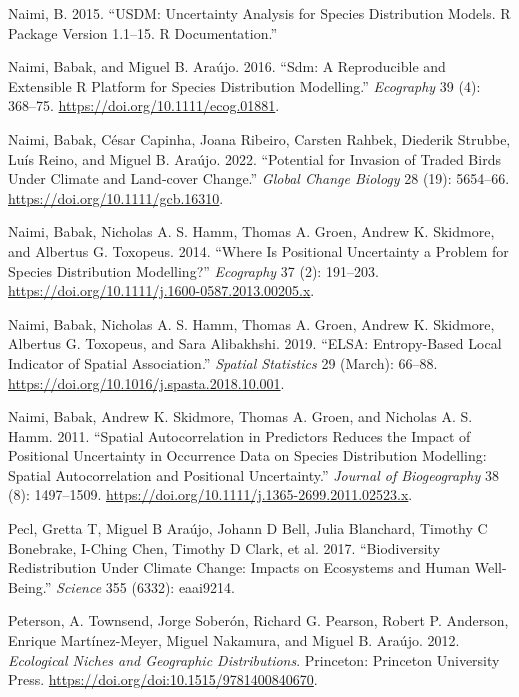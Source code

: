 \documentclass[
]{article}
\newlength{\cslhangindent}
\newenvironment{CSLReferences}[2] %
 {\begin{list}{}{%
  \setlength{\itemindent}{0pt}
  \setlength{\leftmargin}{0pt}
  \setlength{\parsep}{0pt}
  \ifodd #1
   \setlength{\leftmargin}{\cslhangindent}
   \setlength{\itemindent}{-1\cslhangindent}
  \fi
  \setlength{\itemsep}{#2\baselineskip}}}
 {\end{list}}
\begin{document}
\begin{CSLReferences}{1}{0}
Naimi, B. 2015. {``USDM: Uncertainty Analysis for Species Distribution
Models. R Package Version 1.1--15. R Documentation.''}

Naimi, Babak, and Miguel B. Araújo. 2016. {``Sdm: A Reproducible and
Extensible {R} Platform for Species Distribution Modelling.''}
\emph{Ecography} 39 (4): 368--75.
\url{https://doi.org/10.1111/ecog.01881}.

Naimi, Babak, César Capinha, Joana Ribeiro, Carsten Rahbek, Diederik
Strubbe, Luís Reino, and Miguel B. Araújo. 2022. {``Potential for
Invasion of Traded Birds Under Climate and Land‐cover Change.''}
\emph{Global Change Biology} 28 (19): 5654--66.
\url{https://doi.org/10.1111/gcb.16310}.

Naimi, Babak, Nicholas A. S. Hamm, Thomas A. Groen, Andrew K. Skidmore,
and Albertus G. Toxopeus. 2014. {``Where Is Positional Uncertainty a
Problem for Species Distribution Modelling?''} \emph{Ecography} 37 (2):
191--203. \url{https://doi.org/10.1111/j.1600-0587.2013.00205.x}.

Naimi, Babak, Nicholas A. S. Hamm, Thomas A. Groen, Andrew K. Skidmore,
Albertus G. Toxopeus, and Sara Alibakhshi. 2019. {``{ELSA}:
{Entropy}-Based Local Indicator of Spatial Association.''} \emph{Spatial
Statistics} 29 (March): 66--88.
\url{https://doi.org/10.1016/j.spasta.2018.10.001}.

Naimi, Babak, Andrew K. Skidmore, Thomas A. Groen, and Nicholas A. S.
Hamm. 2011. {``Spatial Autocorrelation in Predictors Reduces the Impact
of Positional Uncertainty in Occurrence Data on Species Distribution
Modelling: {Spatial} Autocorrelation and Positional Uncertainty.''}
\emph{Journal of Biogeography} 38 (8): 1497--1509.
\url{https://doi.org/10.1111/j.1365-2699.2011.02523.x}.

Pecl, Gretta T, Miguel B Araújo, Johann D Bell, Julia Blanchard, Timothy
C Bonebrake, I-Ching Chen, Timothy D Clark, et al. 2017. {``Biodiversity
Redistribution Under Climate Change: Impacts on Ecosystems and Human
Well-Being.''} \emph{Science} 355 (6332): eaai9214.

Peterson, A. Townsend, Jorge Soberón, Richard G. Pearson, Robert P.
Anderson, Enrique Martínez-Meyer, Miguel Nakamura, and Miguel B. Araújo.
2012. \emph{Ecological Niches and Geographic Distributions}. Princeton:
Princeton University Press.
\url{https://doi.org/doi:10.1515/9781400840670}.


\end{CSLReferences}
\end{document}
